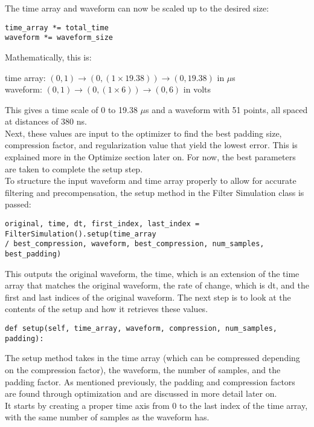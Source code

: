 The time array and waveform can now be scaled up to the desired size:

\begin{verbatim}
time_array *= total_time
waveform *= waveform_size
\end{verbatim}
Mathematically, this is:
\begin{center}
    time array: $(0, 1) \rightarrow (0, (1 \times 19.38 )) \rightarrow (0, 19.38)$ in $\mu$s
    \\
    waveform: $(0, 1) \rightarrow (0, (1 \times 6)) \rightarrow (0, 6)$ in volts
\end{center}

This gives a time scale of 0 to 19.38 $\mu$s and a waveform with 51 points, all spaced at distances of 380 ns.
\\
Next, these values are input to the optimizer to find the best padding size, compression factor, and regularization value that yield the lowest error. This is explained more in the Optimize section later on. For now, the best parameters are taken to complete the setup step.
\\
To structure the input waveform and time array properly to allow for accurate filtering and precompensation, the setup method in the Filter Simulation class is passed:

\begin{verbatim}
original, time, dt, first_index, last_index = FilterSimulation().setup(time_array 
/ best_compression, waveform, best_compression, num_samples, best_padding)
\end{verbatim}

This outputs the original waveform, the time, which is an extension of the time array that matches the original waveform, the rate of change, which is dt, and the first and last indices of the original waveform.  The next step is to look at the contents of the setup and how it retrieves these values.

\begin{verbatim}
def setup(self, time_array, waveform, compression, num_samples, padding):
\end{verbatim}

The setup method takes in the time array (which can be compressed depending on the compression factor), the waveform, the number of samples, and the padding factor. As mentioned previously, the padding and compression factors are found through optimization and are discussed in more detail later on.
\\
It starts by creating a proper time axis from 0 to the last index of the time array, with the same number of samples as the waveform has.


